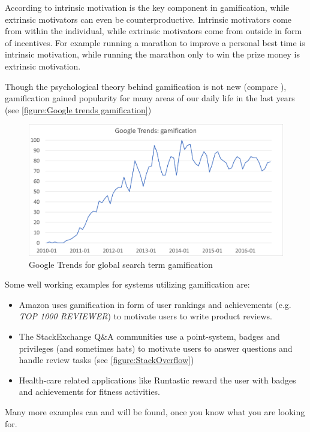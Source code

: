 According to \textcite{Herger2015} intrinsic motivation is the key component in gamification, while extrinsic motivators can even be counterproductive. Intrinsic motivators come from within the individual, while extrinsic motivators come from outside in form of incentives. For example running a marathon to improve a personal best time is intrinsic motivation, while running the marathon only to win the prize money is extrinsic motivation.

Though the psychological theory behind gamification is not new (compare \autocite{White1959}), gamification gained popularity for many areas of our daily life in the last years (see \autoref{figure:Google trends gamification})

\begin{figure}[!htb] %
	\caption[Google Trends: gamification]{Google Trends for global search term gamification} \label{figure:Google trends gamification}
	\includegraphics[scale=1.0]{figures/google_trends_gamification.png}
\end{figure}

Some well working examples for systems utilizing gamification are:
\begin{itemize}
	\item Amazon uses gamification in form of user rankings and achievements (e.g. \textit{TOP 1000 REVIEWER}) to motivate users to write product reviews.
	\item The StackExchange Q\&A communities use a point-system, badges and privileges (and sometimes hats) to motivate users to answer questions and handle review tasks (see \autoref{figure:StackOverflow})
	\item Health-care related applications like Runtastic reward the user with badges and achievements for fitness activities.
\end{itemize}
Many more examples can and will be found, once you know what you are looking for.

